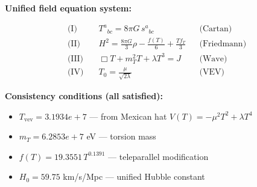 
\textbf{Unified field equation system:}

\begin{align}
  \text{(I)} \quad & T^a{}_{bc} = 8\pi G \, s^a{}_{bc} && \text{(Cartan)} \\
  \text{(II)} \quad & H^2 = \frac{8\pi G}{3}\rho - \frac{f(T)}{6} + \frac{Tf_T}{3} && \text{(Friedmann)} \\
  \text{(III)} \quad & \Box T + m_T^2 T + \lambda T^3 = J && \text{(Wave)} \\
  \text{(IV)} \quad & T_0 = \frac{\mu}{\sqrt{2\lambda}} && \text{(VEV)}
\end{align}

\textbf{Consistency conditions (all satisfied):}
\begin{itemize}
  \item $T_{\text{vev}} = 3.1934e+7$ — from Mexican hat $V(T) = -\mu^2 T^2 + \lambda T^4$
  \item $m_T = 6.2853e+7$ eV — torsion mass
  \item $f(T) = 19.3551 \, T^{0.1391}$ — teleparallel modification
  \item $H_0 = 59.75$ km/s/Mpc — unified Hubble constant
\end{itemize}